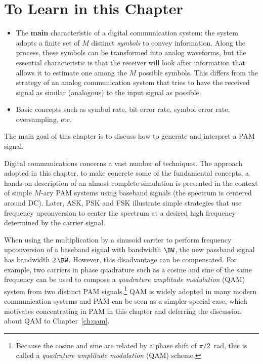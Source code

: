 \section{To Learn in this Chapter}

\begin{itemize}
\item The \textbf{main} characteristic of a digital communication system: the system adopts a finite set of $M$ distinct \emph{symbols} to convey information. Along the process, these symbols can be transformed into analog waveforms, but the essential characteristic is that the receiver will look after information that allows it to estimate one among the $M$ possible symbols. This differs from the strategy of an analog communication system that tries to have the received signal as similar (analogous) to the input signal as possible.
	\item Basic concepts such as symbol rate, bit error rate, symbol error rate, oversampling, etc.

\end{itemize}	

The main goal of this chapter is to discuss how to generate and interpret a PAM signal.

Digital communications concerns a vast number of techniques. The approach adopted in this chapter, 
to make concrete some of the fundamental concepts, a hands-on description of an almost complete simulation is presented in the context of simple $M$-ary PAM systems using baseband signals (the spectrum is centered around DC). Later, ASK, PSK and FSK illustrate simple strategies that use frequency upconversion to center the spectrum at a desired high frequency determined by the carrier signal. 

When using the multiplication by a sinusoid carrier to perform frequency upconversion of a baseband signal with bandwidth $\BW$, the new passband signal has bandwidth $2 \, \BW$. However, this disadvantage can be compensated. For example, two carriers in phase quadrature such as a cosine and sine of the same frequency can be used to compose a \emph{quadrature amplitude modulation} (QAM) system from two distinct PAM signals.\footnote{Because the cosine and sine are related by a phase shift of $\pi/2$~rad, this is called a \emph{quadrature amplitude modulation} (QAM) scheme.} QAM is widely adopted in many modern communication systems and PAM can be seen as a simpler special case, which motivates concentrating in PAM in this chapter and deferring the discussion about QAM to Chapter~\ref{ch:qam}.

